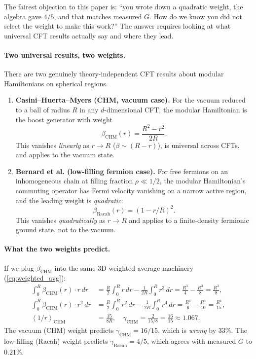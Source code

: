 \documentclass[11pt,letterpaper]{article}
\newcommand{\av}[1]{\left\langle #1 \right\rangle}
\begin{document}
The fairest objection to this paper is: ``you wrote down a quadratic
weight, the algebra gave $4/5$, and that matches measured $G$. How
do we know you did not select the weight to make this work?'' The
answer requires looking at what universal CFT results actually say
and where they lead.

\paragraph{Two universal results, two weights.}
There are two genuinely theory-independent CFT results about modular
Hamiltonians on spherical regions.

\begin{enumerate}
  \item \textbf{Casini--Huerta--Myers (CHM, vacuum case).} For the
    vacuum reduced to a ball of radius $R$ in any $d$-dimensional
    CFT, the modular Hamiltonian is the boost generator with weight
    \begin{equation}
      \beta_{\mathrm{CHM}}(r) = \frac{R^2 - r^2}{2R}.
      \label{eq:chm_weight_forced}
    \end{equation}
    This vanishes \emph{linearly} as $r \to R$
    ($\beta \sim (R-r)$), is universal across CFTs, and applies to
    the vacuum state.
  \item \textbf{Bernard et al. (low-filling fermion case).} For free
    fermions on an inhomogeneous chain at filling fraction
    $\rho \ll 1/2$, the modular Hamiltonian's commuting operator
    has Fermi velocity vanishing on a narrow active region, and the
    leading weight is \emph{quadratic}:
    \begin{equation}
      \beta_{\mathrm{Racah}}(r) = (1 - r/R)^2.
      \label{eq:racah_weight_forced}
    \end{equation}
    This vanishes \emph{quadratically} as $r \to R$ and applies to
    a finite-density fermionic ground state, not to the vacuum.
\end{enumerate}

\paragraph{What the two weights predict.}
If we plug $\beta_{\mathrm{CHM}}$ into the same 3D weighted-average
machinery (\cref{eq:weighted_avg}):
\begin{align}
  \int_0^R \beta_{\mathrm{CHM}}(r) \cdot r \,dr
   &= \tfrac{R}{2}\!\!\int_0^R r\,dr - \tfrac{1}{2R}\!\!\int_0^R r^3\,dr
    = \tfrac{R^3}{4} - \tfrac{R^3}{8} = \tfrac{R^3}{8}, \\
  \int_0^R \beta_{\mathrm{CHM}}(r) \cdot r^2 \,dr
   &= \tfrac{R}{2}\!\!\int_0^R r^2\,dr - \tfrac{1}{2R}\!\!\int_0^R r^4\,dr
    = \tfrac{R^4}{6} - \tfrac{R^4}{10} = \tfrac{R^4}{15}, \\
  \av{1/r}_{\mathrm{CHM}} &= \tfrac{15}{8R}, \quad
  \gamma_{\mathrm{CHM}} = \tfrac{2}{15/8} = \tfrac{16}{15} \approx 1.067.
\end{align}
The vacuum (CHM) weight predicts $\gamma_{\mathrm{CHM}} = 16/15$,
which is \emph{wrong} by $33\%$. The low-filling (Racah) weight
predicts $\gamma_{\mathrm{Racah}} = 4/5$, which agrees with measured
$G$ to $0.21\%$.
\end{document}
